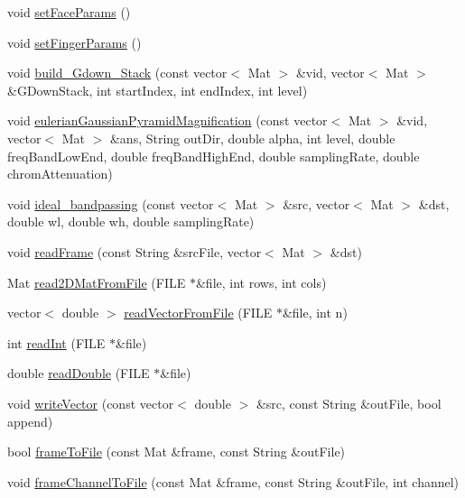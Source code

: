 \begin{DoxyCompactItemize}
\item 
void \hyperlink{namespace_m_h_r_a48555f02f08d43ff1f06f9413c86b5ca}{set\+Face\+Params} ()
\item 
void \hyperlink{namespace_m_h_r_af336ca7b239bbe520636c7d147b913b5}{set\+Finger\+Params} ()
\item 
void \hyperlink{namespace_m_h_r_ae1292cc4cfc5411226e0cd77f652e1a5}{build\+\_\+\+Gdown\+\_\+\+Stack} (const vector$<$ Mat $>$ \&vid, vector$<$ Mat $>$ \&G\+Down\+Stack, int start\+Index, int end\+Index, int level)
\item 
void \hyperlink{namespace_m_h_r_af2ec0b4fd5bc225e5e008504e70475a7}{eulerian\+Gaussian\+Pyramid\+Magnification} (const vector$<$ Mat $>$ \&vid, vector$<$ Mat $>$ \&ans, String out\+Dir, double alpha, int level, double freq\+Band\+Low\+End, double freq\+Band\+High\+End, double sampling\+Rate, double chrom\+Attenuation)
\item 
void \hyperlink{namespace_m_h_r_a103bcf8925254f7ca646192777866d4b}{ideal\+\_\+bandpassing} (const vector$<$ Mat $>$ \&src, vector$<$ Mat $>$ \&dst, double wl, double wh, double sampling\+Rate)
\item 
void \hyperlink{namespace_m_h_r_a3b899245a37e41550b80b44fb40fe3e9}{read\+Frame} (const String \&src\+File, vector$<$ Mat $>$ \&dst)
\item 
Mat \hyperlink{namespace_m_h_r_aca720721cf34fb61faddf517a6f1ecb7}{read2\+D\+Mat\+From\+File} (F\+I\+L\+E $\ast$\&file, int rows, int cols)
\item 
vector$<$ double $>$ \hyperlink{namespace_m_h_r_a8b31e05ada67db2ce123a0674568ad29}{read\+Vector\+From\+File} (F\+I\+L\+E $\ast$\&file, int n)
\item 
int \hyperlink{namespace_m_h_r_aca054bab24695d684662a7972fc07d02}{read\+Int} (F\+I\+L\+E $\ast$\&file)
\item 
double \hyperlink{namespace_m_h_r_a30d68a835eaf7530b13d542662a88642}{read\+Double} (F\+I\+L\+E $\ast$\&file)
\item 
void \hyperlink{namespace_m_h_r_a391cd23b86d2d7411411d4595cb74b86}{write\+Vector} (const vector$<$ double $>$ \&src, const String \&out\+File, bool append)
\item 
bool \hyperlink{namespace_m_h_r_aa23b9d8c3b852392335d3d9df6afc874}{frame\+To\+File} (const Mat \&frame, const String \&out\+File)
\item 
void \hyperlink{namespace_m_h_r_a093ff56ed91709ddd3cd6bc1575ca55b}{frame\+Channel\+To\+File} (const Mat \&frame, const String \&out\+File, int channel)

\end{DoxyCompactItemize}
